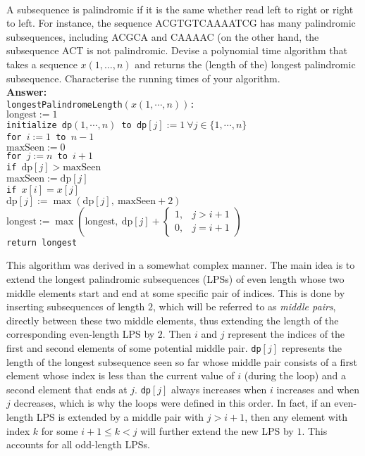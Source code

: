 \documentclass[a4paper,11pt]{article}
\begin{document}
\\ 
A subsequence is palindromic if it is the same whether read left to right or right to left. 
For instance, the sequence ACGTGTCAAAATCG has many palindromic subsequences,
 including ACGCA and CAAAAC (on the other hand, the subsequence ACT is not palindromic. 
 Devise a polynomial time algorithm that takes a sequence $x(1, \ldots , n)$
and returns the (length of the) longest palindromic subsequence.
Characterise the running times of your algorithm.\\
{\bf Answer:} \\
\texttt{longestPalindromeLength$(x(1, \cdots, n))$: \\
\indent $\text{longest} := 1$ \\
\indent initialize dp$(1, \cdots, n)$ to dp$[j] := 1 \ \forall j \in \{ 1, \cdots, n \}$ \\
\indent for $i := 1$ to $n - 1$ \\
\indent \indent $\text{maxSeen} := 0$ \\
\indent \indent for $j := n$ to $i + 1$ \\
\indent \indent \indent if $\text{dp}[j] > \text{maxSeen}$ \\
\indent \indent \indent \indent $\text{maxSeen} := \text{dp}[j]$ \\
\indent \indent \indent if $x[i] = x[j]$ \\
\indent \indent \indent \indent $\text{dp}[j] := \max(\text{dp}[j],\ \text{maxSeen} + 2)$ \\
\indent \indent \indent \indent $\text{longest} := \max \left( \text{longest},\ \text{dp}[j] + \begin{cases}
    1, &j > i + 1 \\
    0, &j = i + 1
\end{cases} \right)$ \\
\indent return longest
} \\\par
This algorithm was derived in a somewhat complex manner. The main idea is to extend the longest palindromic subsequences (LPSs) of even length whose two middle elements start and end at some specific pair of indices. This is done by inserting subsequences of length $2$, which will be referred to as \textit{middle pairs}, directly between these two middle elements, thus extending the length of the corresponding even-length LPS by $2$. Then $i$ and $j$ represent the indices of the first and second elements of some potential middle pair. \texttt{dp}$[j]$ represents the length of the longest subsequence seen so far whose middle pair consists of a first element whose index is less than the current value of $i$ (during the loop) and a second element that ends at $j$. \texttt{dp}$[j]$ always increases when $i$ increases and when $j$ decreases, which is why the loops were defined in this order. In fact, if an even-length LPS is extended by a middle pair with $j > i + 1$, then any element with index $k$ for some $i + 1 \leq k < j$ will further extend the new LPS by $1$. This accounts for all odd-length LPSs. \par
\end{document}
